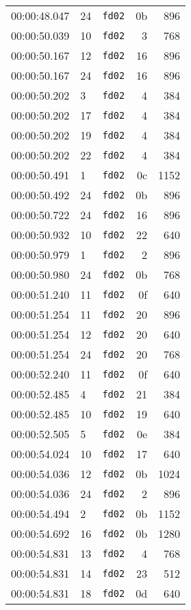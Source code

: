 \documentclass{article}
\begin{document}
\begin{longtable}{lllrr}
00:00:48.047 & 24 & \texttt{fd02} & 0b & 896 \\
00:00:50.039 & 10 & \texttt{fd02} & 3 & 768 \\
00:00:50.167 & 12 & \texttt{fd02} & 16 & 896 \\
00:00:50.167 & 24 & \texttt{fd02} & 16 & 896 \\
00:00:50.202 & 3 & \texttt{fd02} & 4 & 384 \\
00:00:50.202 & 17 & \texttt{fd02} & 4 & 384 \\
00:00:50.202 & 19 & \texttt{fd02} & 4 & 384 \\
00:00:50.202 & 22 & \texttt{fd02} & 4 & 384 \\
00:00:50.491 & 1 & \texttt{fd02} & 0c & 1152 \\
00:00:50.492 & 24 & \texttt{fd02} & 0b & 896 \\
00:00:50.722 & 24 & \texttt{fd02} & 16 & 896 \\
00:00:50.932 & 10 & \texttt{fd02} & 22 & 640 \\
00:00:50.979 & 1 & \texttt{fd02} & 2 & 896 \\
00:00:50.980 & 24 & \texttt{fd02} & 0b & 768 \\
00:00:51.240 & 11 & \texttt{fd02} & 0f & 640 \\
00:00:51.254 & 11 & \texttt{fd02} & 20 & 896 \\
00:00:51.254 & 12 & \texttt{fd02} & 20 & 640 \\
00:00:51.254 & 24 & \texttt{fd02} & 20 & 768 \\
00:00:52.240 & 11 & \texttt{fd02} & 0f & 640 \\
00:00:52.485 & 4 & \texttt{fd02} & 21 & 384 \\
00:00:52.485 & 10 & \texttt{fd02} & 19 & 640 \\
00:00:52.505 & 5 & \texttt{fd02} & 0e & 384 \\
00:00:54.024 & 10 & \texttt{fd02} & 17 & 640 \\
00:00:54.036 & 12 & \texttt{fd02} & 0b & 1024 \\
00:00:54.036 & 24 & \texttt{fd02} & 2 & 896 \\
00:00:54.494 & 2 & \texttt{fd02} & 0b & 1152 \\
00:00:54.692 & 16 & \texttt{fd02} & 0b & 1280 \\
00:00:54.831 & 13 & \texttt{fd02} & 4 & 768 \\
00:00:54.831 & 14 & \texttt{fd02} & 23 & 512 \\
00:00:54.831 & 18 & \texttt{fd02} & 0d & 640 \\

\end{longtable}
\end{document}
